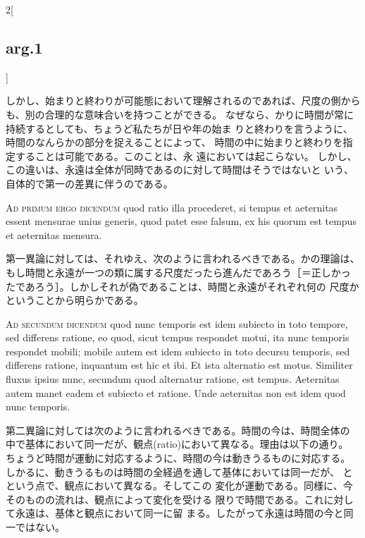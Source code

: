 \documentclass[paper=a4paper,fontsize=10pt,jafontsize=9pt,titlepage]{jlreq}
\begin{document}
\begin{paracol}{2}[\subsection{arg.1}]
\switchcolumn

しかし、始まりと終わりが可能態において理解されるのであれば、尺度の側から
も、別の合理的な意味合いを持つことができる。
なぜなら、かりに時間が常に持続するとしても、ちょうど私たちが日や年の始ま
りと終わりを言うように、時間のなんらかの部分を捉えることによって、
時間の中に始まりと終わりを指定することは可能である。このことは、永
遠においては起こらない。
しかし、この違いは、永遠は全体が同時であるのに対して時間はそうではないと
いう、自体的で第一の差異に伴うのである。

\switchcolumn*[\subsection{ad.1}]

{\scshape Ad primum ergo dicendum} quod ratio illa procederet, si tempus
et aeternitas essent mensurae unius generis, quod patet esse falsum, ex
his quorum est tempus et aeternitas mensura.

\switchcolumn

第一異論に対しては、それゆえ、次のように言われるべきである。かの理論は、
もし時間と永遠が一つの類に属する尺度だったら進んだであろう［＝正しかっ
たであろう］。しかしそれが偽であることは、時間と永遠がそれぞれ何の
尺度かということから明らかである。

\switchcolumn*[\subsection{ad.2}]

{\scshape Ad secundum dicendum} quod nunc temporis est idem subiecto in toto
tempore, sed differens ratione, eo quod, sicut tempus respondet motui,
ita nunc temporis respondet mobili; mobile autem est idem subiecto in
toto decursu temporis, sed differens ratione, inquantum est hic et
ibi. Et ista alternatio est motus. Similiter fluxus ipsius nunc,
secundum quod alternatur ratione, est tempus. Aeternitas autem manet
eadem et subiecto et ratione. Unde aeternitas non est idem quod nunc
temporis.

\switchcolumn

第二異論に対しては次のように言われるべきである。時間の今は、時間全体の
中で基体において同一だが、観点(ratio)において異なる。理由は以下の通り。
ちょうど時間が運動に対応するように、時間の今は動きうるものに対応する。
しかるに、動きうるものは時間の全経過を通して基体においては同一だが、
とという点で、観点において異なる。そしてこの
変化が運動である。同様に、今そのものの流れは、観点によって変化を受ける
限りで時間である。これに対して永遠は、基体と観点において同一に留
まる。したがって永遠は時間の今と同一ではない。


\end{paracol}
\end{document}
